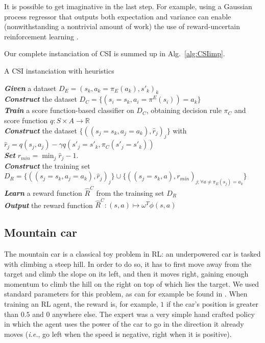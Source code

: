 \documentclass{llncs}
\begin{document}
It is possible to get imaginative in the last step. For example, using a Gaussian process regressor \cite{rasmussen2006gaussian} that outputs both expectation and variance can enable (nonwithstanding a nontrivial amount of work) the use of reward-uncertain reinforcement learning \cite{regan2011robust}. 

Our complete instanciation of CSI is summed up in Alg.~\ref{alg:CSIimp}.
\begin{algorithm}%
  \caption{A CSI instanciation with heuristics}
  \label{alg:CSIimp}
  \emph{\textbf{Given}} a dataset  $D_E = (s_k,a_k=\pi_E(a_k),s'_k)_k$\;\\
  \emph{\textbf{Construct}} the dataset $D_C=\{(s_i=s_k,a_i=\pi^E(s_i))=a_k\}$ \;\\
  \emph{\textbf{Train}} a score function-based classifier on $D_C$, obtaining decision rule $\pi_C$ and score function $q:S\times A \rightarrow \mathbb R$ \;\\
\emph{\textbf{Construct}} the dataset $\{((s_{j}=s_k,a_{j}=a_k),\hat r_j)_j\}$ with $\hat r_j = q(s_j,a_j) - \gamma q(s'_j=s'_k,\pi_C(s'_j=s'_k))$\;\\
\emph{\textbf{Set}} $r_{min} = \min_j\hat r_j - 1.$\;\\
\emph{\textbf{Construct}} the training set  $D_R = \{((s_{j}=s_k,a_{j}=a_k),\hat r_j)_j\}\cup\{((s_j=s_k,a),r_{min})_{j;\forall a\neq \pi_E(s_j) = a_k}\}$ \;\\
\emph{\textbf{Learn}} a reward function $\hat R^C$ from the trainsing set $D_R$\;\\
\emph{\textbf{Output}} the reward function $\hat R^{C}: (s,a) \mapsto \omega^T \phi(s,a)$ \;
\end{algorithm}
\subsection{Mountain car}
\label{subsec:mountaincar}
The mountain car is a classical toy problem in RL: an underpowered car is tasked with climbing a steep hill. In order to do so, it has to first move away from the target and climb the slope on its left, and then it moves right, gaining enough momentum to climb the hill on the right on top of which lies the target. We used standard parameters for this problem, as can for example be found in \cite{sutton1998reinforcement}. When training an RL agent, the reward is, for example, $1$ if the car's position is greater than $0.5$ and $0$ anywhere else. The expert was a very simple hand crafted policy in which the agent uses the power of the car to go in the direction it already moves ({\it i.e.}, go left when the speed is negative, right when it is positive).\\
\end{document}
